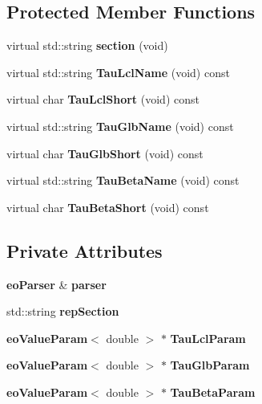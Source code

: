 \subsection*{Protected Member Functions}
\begin{CompactItemize}
\item 
virtual std::string {\bf section} (void)\label{classeo_es_mutation_init_b0}

\item 
virtual std::string {\bf Tau\-Lcl\-Name} (void) const \label{classeo_es_mutation_init_b1}

\item 
virtual char {\bf Tau\-Lcl\-Short} (void) const \label{classeo_es_mutation_init_b2}

\item 
virtual std::string {\bf Tau\-Glb\-Name} (void) const \label{classeo_es_mutation_init_b3}

\item 
virtual char {\bf Tau\-Glb\-Short} (void) const \label{classeo_es_mutation_init_b4}

\item 
virtual std::string {\bf Tau\-Beta\-Name} (void) const \label{classeo_es_mutation_init_b5}

\item 
virtual char {\bf Tau\-Beta\-Short} (void) const \label{classeo_es_mutation_init_b6}

\end{CompactItemize}
\subsection*{Private Attributes}
\begin{CompactItemize}
\item 
{\bf eo\-Parser} \& {\bf parser}\label{classeo_es_mutation_init_r0}

\item 
std::string {\bf rep\-Section}\label{classeo_es_mutation_init_r1}

\item 
{\bf eo\-Value\-Param}$<$ double $>$ $\ast$ {\bf Tau\-Lcl\-Param}\label{classeo_es_mutation_init_r2}

\item 
{\bf eo\-Value\-Param}$<$ double $>$ $\ast$ {\bf Tau\-Glb\-Param}\label{classeo_es_mutation_init_r3}

\item 
{\bf eo\-Value\-Param}$<$ double $>$ $\ast$ {\bf Tau\-Beta\-Param}\label{classeo_es_mutation_init_r4}

\end{CompactItemize}


